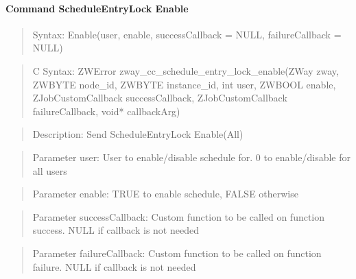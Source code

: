 \paragraph{Command ScheduleEntryLock Enable}
\begin{quote}Syntax: Enable(user, enable, successCallback = NULL, failureCallback = NULL)\end{quote}
\begin{quote}C Syntax: ZWError zway\_cc\_schedule\_entry\_lock\_enable(ZWay zway, ZWBYTE node\_id, ZWBYTE instance\_id, int user, ZWBOOL enable, ZJobCustomCallback successCallback, ZJobCustomCallback failureCallback, void* callbackArg)\end{quote}
\begin{quote}Description: Send ScheduleEntryLock Enable(All)\end{quote}
\begin{quote}Parameter user: User to enable/disable schedule for. 0 to enable/disable for all users\end{quote}
\begin{quote}Parameter enable: TRUE to enable schedule, FALSE otherwise\end{quote}
\begin{quote}Parameter successCallback: Custom function to be called on function success. NULL if callback is not needed\end{quote}
\begin{quote}Parameter failureCallback: Custom function to be called on function failure. NULL if callback is not needed\end{quote}



